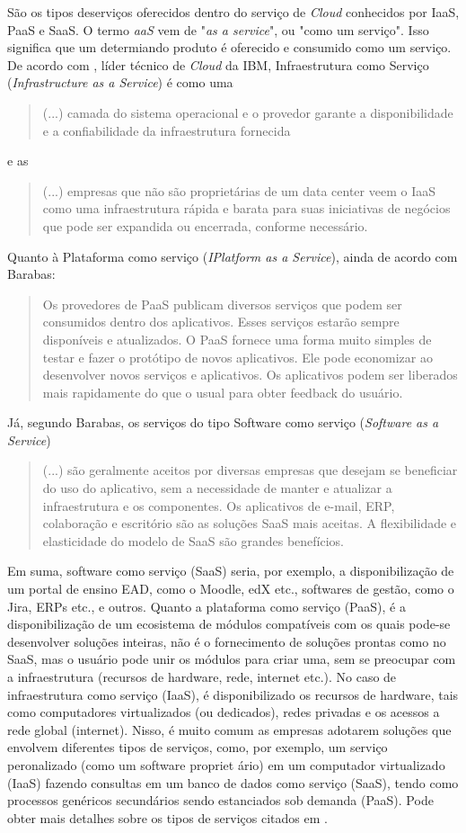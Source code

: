 \documentclass[a4paper]{article}
\newcommand{\C}{\emph{Cloud }}
\begin{document}
São os tipos deserviços oferecidos dentro do serviço de \C conhecidos por IaaS, PaaS e SaaS. O termo \emph{aaS} vem de "\emph{as a service}", ou "como um serviço". Isso significa que um determiando produto é oferecido e consumido como um serviço. De acordo com , líder técnico de \C da IBM, Infraestrutura como Serviço (\emph{Infrastructure as a Service}) é como uma 
\begin{quotation}
(...) camada do sistema operacional e o provedor garante a disponibilidade e a confiabilidade da infraestrutura fornecida
\end{quotation}
e as
\begin{quotation}
(...) empresas que não são proprietárias de um data center veem o IaaS como uma infraestrutura rápida e barata para suas iniciativas de negócios que pode ser expandida ou encerrada, conforme necessário.
\end{quotation}
Quanto à Plataforma como serviço (\emph{IPlatform as a Service}), ainda de acordo com Barabas:
\begin{quotation}
Os provedores de PaaS publicam diversos serviços que podem ser consumidos dentro dos aplicativos. Esses serviços estarão sempre disponíveis e atualizados. O PaaS fornece uma forma muito simples de testar e fazer o protótipo de novos aplicativos. Ele pode economizar ao desenvolver novos serviços e aplicativos. Os aplicativos podem ser liberados mais rapidamente do que o usual para obter feedback do usuário.
\end{quotation}
Já, segundo Barabas, os serviços do tipo Software como serviço (\emph{Software as a Service}) 
\begin{quotation}
(...) são geralmente aceitos por diversas empresas que desejam se beneficiar do uso do aplicativo, sem a necessidade de manter e atualizar a infraestrutura e os componentes. Os aplicativos de e-mail, ERP, colaboração e escritório são as soluções SaaS mais aceitas. A flexibilidade e elasticidade do modelo de SaaS são grandes benefícios.
\end{quotation}

Em suma, software como serviço (SaaS) seria, por exemplo, a disponibilização de um portal de ensino EAD, como o Moodle, edX etc., softwares de gestão, como o Jira, ERPs etc., e outros. Quanto a plataforma como serviço (PaaS), é a disponibilização de um ecosistema de módulos compatíveis com os quais pode-se desenvolver soluções inteiras, não é o fornecimento de soluções prontas como no SaaS, mas o usuário pode unir os módulos para criar uma, sem se preocupar com a infraestrutura (recursos de hardware, rede, internet etc.). No caso de infraestrutura como serviço (IaaS), é disponibilizado os recursos de hardware, tais como computadores virtualizados (ou dedicados), redes privadas e os acessos a rede global (internet). Nisso, é muito comum as empresas adotarem soluções que envolvem diferentes tipos de serviços, como, por exemplo, um serviço peronalizado (como um software propriet
ário) em um computador virtualizado (IaaS) fazendo consultas em um banco de dados como serviço (SaaS), tendo como processos genéricos secundários sendo estanciados sob demanda (PaaS). Pode obter mais detalhes sobre os tipos de serviços citados em . 
\end{document}
